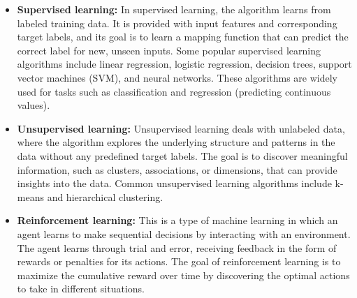 \documentclass{vgtc}                          %
\begin{document}
\begin{itemize}
  \item \textbf{Supervised learning:} In supervised learning, the algorithm learns from labeled training data. It is provided with input features and corresponding target labels, and its goal is to 
  learn a mapping function that can predict the correct label for new, unseen inputs. Some popular supervised learning algorithms include linear regression, logistic regression, decision trees, 
  support vector machines (SVM), and neural networks. These algorithms are widely used for tasks such as classification and regression (predicting continuous values).
  \item \textbf{Unsupervised learning:} Unsupervised learning deals with unlabeled data, where the algorithm explores the underlying structure and patterns in the data without any predefined 
  target labels. The goal is to discover meaningful information, such as clusters, associations, or dimensions, that can provide insights into the data. Common unsupervised learning algorithms 
  include k-means and hierarchical clustering.
  \item \textbf{Reinforcement learning:} This is a type of machine learning in which an agent learns to make sequential decisions by interacting with an environment. The agent learns through 
  trial and error, receiving feedback in the form of rewards or penalties for its actions. The goal of reinforcement learning is to maximize the cumulative reward over time by discovering the 
  optimal actions to take in different situations.
\end{itemize} 
\end{document}
